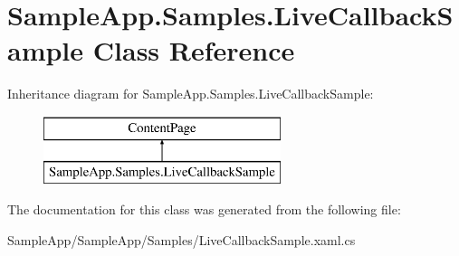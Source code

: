 \hypertarget{class_sample_app_1_1_samples_1_1_live_callback_sample}{}\section{Sample\+App.\+Samples.\+Live\+Callback\+Sample Class Reference}
\label{class_sample_app_1_1_samples_1_1_live_callback_sample}
Inheritance diagram for Sample\+App.\+Samples.\+Live\+Callback\+Sample\+:\begin{figure}[H]
\begin{center}
\leavevmode
\includegraphics[height=2.000000cm]{class_sample_app_1_1_samples_1_1_live_callback_sample}
\end{center}
\end{figure}


The documentation for this class was generated from the following file\+:\begin{DoxyCompactItemize}
\item 
Sample\+App/\+Sample\+App/\+Samples/Live\+Callback\+Sample.\+xaml.\+cs\end{DoxyCompactItemize}
